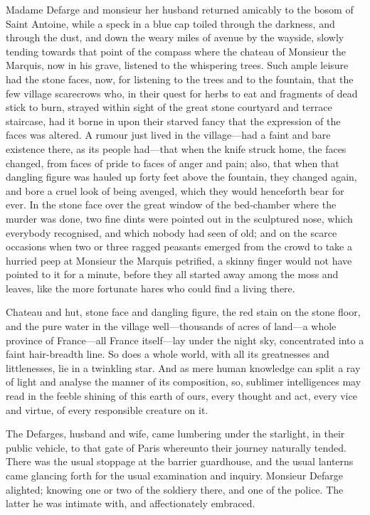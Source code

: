 Madame Defarge and monsieur her husband returned amicably to the bosom
of Saint Antoine, while a speck in a blue cap toiled through the
darkness, and through the dust, and down the weary miles of avenue by
the wayside, slowly tending towards that point of the compass where the
chateau of Monsieur the Marquis, now in his grave, listened to the
whispering trees.  Such ample leisure had the stone faces, now, for
listening to the trees and to the fountain, that the few village
scarecrows who, in their quest for herbs to eat and fragments of dead
stick to burn, strayed within sight of the great stone courtyard and
terrace staircase, had it borne in upon their starved fancy that the
expression of the faces was altered.  A rumour just lived in the
village---had a faint and bare existence there, as its people had---that
when the knife struck home, the faces changed, from faces of pride to
faces of anger and pain; also, that when that dangling figure was
hauled up forty feet above the fountain, they changed again, and bore
a cruel look of being avenged, which they would henceforth bear
for ever.  In the stone face over the great window of the bed-chamber
where the murder was done, two fine dints were pointed out in the
sculptured nose, which everybody recognised, and which nobody had
seen of old; and on the scarce occasions when two or three ragged
peasants emerged from the crowd to take a hurried peep at Monsieur
the Marquis petrified, a skinny finger would not have pointed to it
for a minute, before they all started away among the moss and leaves,
like the more fortunate hares who could find a living there.

Chateau and hut, stone face and dangling figure, the red stain on the
stone floor, and the pure water in the village well---thousands of acres
of land---a whole province of France---all France itself---lay under the
night sky, concentrated into a faint hair-breadth line.  So does a
whole world, with all its greatnesses and littlenesses, lie in a
twinkling star.  And as mere human knowledge can split a ray of light
and analyse the manner of its composition, so, sublimer intelligences
may read in the feeble shining of this earth of ours, every thought
and act, every vice and virtue, of every responsible creature on it.

The Defarges, husband and wife, came lumbering under the starlight,
in their public vehicle, to that gate of Paris whereunto their journey
naturally tended.  There was the usual stoppage at the barrier
guardhouse, and the usual lanterns came glancing forth for the usual
examination and inquiry.  Monsieur Defarge alighted; knowing one or
two of the soldiery there, and one of the police.  The latter he was
intimate with, and affectionately embraced.

